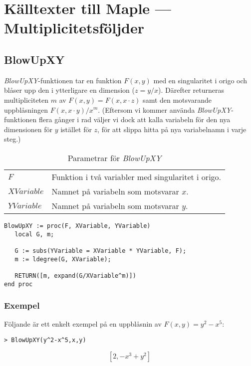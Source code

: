 \chapter[Källtexter --- Multiplicitetsföljder]{Källtexter till Maple --- Multiplicitetsföljder}

\section{BlowUpXY}
\label{BlowUpXY}

\emph{BlowUpXY}-funktionen tar en funktion $F(x, y)$ med en singularitet i origo och blåser upp den i ytterligare en dimension ($z=y/x$). Därefter returneras multipliciteten $m$ av $F(x,y) = F(x, x \cdot z)$ samt den motsvarande uppblåsningen $F(x, x \cdot y)/{x^m}$. (Eftersom vi kommer använda \emph{BlowUpXY}-funktionen flera gånger i rad väljer vi dock att kalla variabeln för den nya dimensionen för $y$ istället för $z$, för att slippa hitta på nya variabelnamn i varje steg.)

\begin{table}[h]
\caption{Parametrar för \emph{BlowUpXY}}
\begin{center}
\begin{tabular}{|l|p{9cm}|}
\hline
$F$ & Funktion i två variabler med singularitet i origo. \\
$XVariable$ & Namnet på variabeln som motsvarar $x$.\\
$YVariable$ & Namnet på variabeln som motsvarar $y$.\\
\hline
\end{tabular}
\end{center}
\end{table}

\begin{verbatim}
BlowUpXY := proc(F, XVariable, YVariable)
   local G, m;

   G := subs(YVariable = XVariable * YVariable, F);
   m := ldegree(G, XVariable);

   RETURN([m, expand(G/XVariable^m)])
end proc
\end{verbatim}

\subsection{Exempel}

Följande är ett enkelt exempel på en uppblåsnin av $F(x,y)=y^2-x^5$:

\begin{verbatim}
> BlowUpXY(y^2-x^5,x,y)
\end{verbatim}
\[[2, -x^3+y^2]\]

